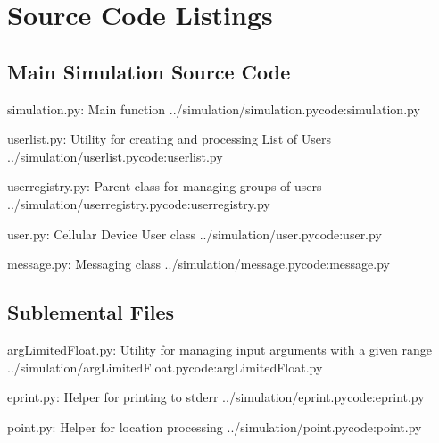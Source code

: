 \section{Source Code Listings}
\label{appendix:code}

\subsection{Main Simulation Source Code}
\simcode
{simulation.py: Main function}
{../simulation/simulation.py}{code:simulation.py}

\simcode
{userlist.py: Utility for creating and processing List of Users}
{../simulation/userlist.py}{code:userlist.py}

\simcode
{userregistry.py: Parent class for managing groups of users}
{../simulation/userregistry.py}{code:userregistry.py}

\simcode
{user.py: Cellular Device User class}
{../simulation/user.py}{code:user.py}

\simcode
{message.py: Messaging class}
{../simulation/message.py}{code:message.py}

\subsection{Sublemental Files}
\simcode
{argLimitedFloat.py: Utility for managing input arguments with a given range}
{../simulation/argLimitedFloat.py}{code:argLimitedFloat.py}

\simcode
{eprint.py: Helper for printing to stderr}
{../simulation/eprint.py}{code:eprint.py}

\simcode
{point.py: Helper for location processing}
{../simulation/point.py}{code:point.py}
